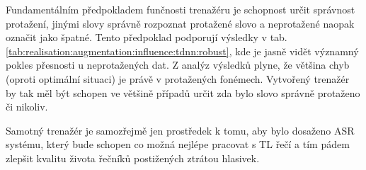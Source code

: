 Fundamentálním předpokladem funčnosti trenažéru je schopnost určit správnost protažení, jinými slovy správně rozpoznat protažené slovo a neprotažené naopak označit jako špatné. Tento předpoklad podporují výsledky v tab. \ref{tab:realisation:augmentation:influence:tdnn:robust}, kde je jasně vidět významný pokles přesnosti u neprotažených dat. Z analýz výsledků plyne, že většina chyb (oproti optimální situaci) je právě v protažených fonémech. Vytvořený trenažér by tak měl být schopen ve většině případů určit zda bylo slovo správně protaženo či nikoliv.

Samotný trenažér je samozřejmě jen prostředek k tomu, aby bylo dosaženo ASR systému, který bude schopen co možná nejlépe pracovat s TL řečí a tím pádem zlepšit kvalitu života řečníků postižených ztrátou hlasivek.


